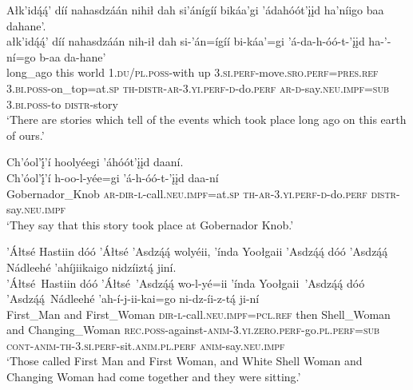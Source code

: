 \ea\label{ex:text5-1-1}
Ałk’idą́ą́’ díí nahasdzáán nihił dah si’ánígíí bikáa’gi ’ádahóót’įįd ha’níigo baa dahane’.\\
\gll ałk’idą́ą́’	díí	nahasdzáán	nih-ił	dah	si-’án=ígíí	bi-káa’=gi	’á-da-h-óó-t-’įįd	ha-’-ní=go	b-aa	da-hane’\\
     long\_ago	this	world	1.\textsc{du}/\textsc{pl}.\textsc{poss}-with	up	3.\textsc{si}.\textsc{perf}-move.\textsc{sro}.\textsc{perf}=\textsc{pres}.\textsc{ref}	3.\textsc{bi}.\textsc{poss}-on\_top=at.\textsc{sp}	\textsc{th}-\textsc{distr}-\textsc{ar}-3.\textsc{yi}.\textsc{perf}-\textsc{d}-do.\textsc{perf}	\textsc{ar}-\textsc{d}-say.\textsc{neu}.\textsc{impf}=\textsc{sub}	3.\textsc{bi}.\textsc{poss}-to	\textsc{distr}-story\\
\glt `There are stories which tell of the events which took place long ago on this earth of ours.'
\z

\ea\label{ex:text5-1-2}
Ch’óol’į́’í hoolyéegi ’áhóót’įįd daaní.\\
\gll Ch’óol’į́’í	h-oo-l-yée=gi	’á-h-óó-t-’įįd	daa-ní\\
     Gobernador\_Knob	\textsc{ar}-\textsc{dir}-\textsc{l}-call.\textsc{neu}.\textsc{impf}=at.\textsc{sp}	\textsc{th}-\textsc{ar}-3.\textsc{yi}.\textsc{perf}-\textsc{d}-do.\textsc{perf}	\textsc{distr}-say.\textsc{neu}.\textsc{impf}\\
\glt `They say that this story took place at Gobernador Knob.'
\z

\ea\label{ex:text5-2-1}
’Áłtsé Hastiin dóó ’Áłtsé ’Asdzą́ą́ wolyéii, ’índa Yoołgaii ’Asdzą́ą́ dóó ’Asdzą́ą́ Nádleehé ’ahíjiikaigo nidzíiztą́ jiní.\\
\gll ’Áłtsé~{Hastiin}	dóó	’Áłtsé~{’Asdzą́ą́}	wo-l-yé=ii	’índa	Yoołgaii~{’Asdzą́ą́}	dóó	’Asdzą́ą́~{Nádleehé}	’ah-í-j-ii-kai=go	ni-dz-íi-z-tą́	ji-ní\\
     First\_Man	and	First\_Woman	\textsc{dir}-\textsc{l}-call.\textsc{neu}.\textsc{impf}=\textsc{pcl}.\textsc{ref}	then	Shell\_Woman	and	Changing\_Woman	\textsc{rec}.\textsc{poss}-against-\textsc{anim}-3.\textsc{yi}.\textsc{zero}.\textsc{perf}-go.\textsc{pl}.\textsc{perf}=\textsc{sub}	\textsc{cont}-\textsc{anim}-\textsc{th}-3.\textsc{si}.\textsc{perf}-sit.\textsc{anim}.\textsc{pl}.\textsc{perf}	\textsc{anim}-say.\textsc{neu}.\textsc{impf}\\
\glt `Those called First Man and First Woman, and White Shell Woman and Changing Woman had come together and they were sitting.'
\z

